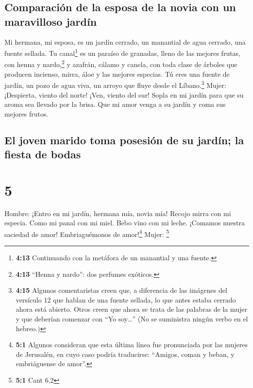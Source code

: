 \hypertarget{comparaciuxf3n-de-la-esposa-de-la-novia-con-un-maravilloso-jarduxedn}{%
\subsection{Comparación de la esposa de la novia con un maravilloso
jardín}\label{comparaciuxf3n-de-la-esposa-de-la-novia-con-un-maravilloso-jarduxedn}}

 Mi hermana, mi esposa, es un jardín cerrado, un
manantial de agua cerrado, una fuente sellada.  Tu
canal\footnote{\textbf{4:13} Continuando con la metáfora de un manantial
  y una fuente.} es un paraíso de granadas, lleno de las mejores frutas,
con henna y nardo,\footnote{\textbf{4:13} ``Henna y nardo'': dos
  perfumes exóticos.}  y azafrán, cálamo y canela, con
toda clase de árboles que producen incienso, mirra, áloe y las mejores
especias.  Tú eres una fuente de jardín, un pozo de agua
viva, un arroyo que fluye desde el Líbano.\footnote{\textbf{4:15}
  Algunos comentaristas creen que, a diferencia de las imágenes del
  versículo 12 que hablan de una fuente sellada, lo que antes estaba
  cerrado ahora está abierto. Otros creen que ahora se trata de las
  palabras de la mujer y que deberían comenzar con ``Yo soy\ldots{}''
  (No se suministra ningún verbo en el hebreo.)} Mujer: 
¡Despierta, viento del norte! ¡Ven, viento del sur! Sopla en mi jardín
para que su aroma sea llevado por la brisa. Que mi amor venga a su
jardín y coma sus mejores frutos.

\hypertarget{el-joven-marido-toma-posesiuxf3n-de-su-jarduxedn-la-fiesta-de-bodas}{%
\subsection{El joven marido toma posesión de su jardín; la fiesta de
bodas}\label{el-joven-marido-toma-posesiuxf3n-de-su-jarduxedn-la-fiesta-de-bodas}}

\hypertarget{section-4}{%
\section{5}\label{section-4}}

Hombre:  ¡Entro en mi jardín, hermana mía, novia mía!
Recojo mirra con mi especia. Como mi panal con mi miel. Bebo vino con mi
leche. ¡Comamos nuestra saciedad de amor! Embriaguémonos de
amor!\footnote{\textbf{5:1} Algunos consideran que esta última línea fue
  pronunciada por las mujeres de Jerusalén, en cuyo caso podría
  traducirse: ``Amigos, coman y beban, y embriáguense de amor''.} Mujer:
\footnote{\textbf{5:1} Cant 6,2}

